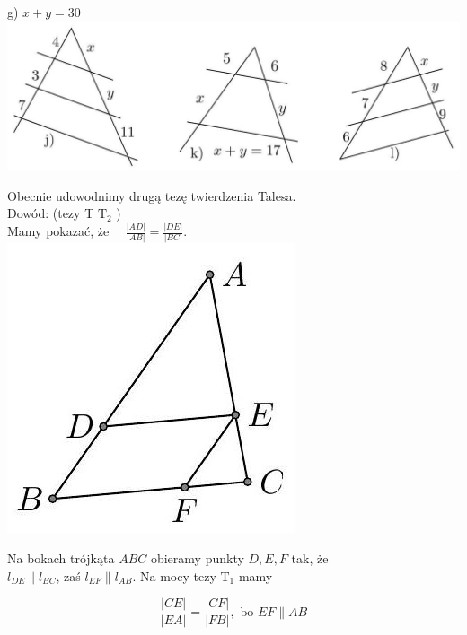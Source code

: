 \documentclass[10pt]{article}
\begin{document}
\begin{enumerate}
g) \(x+y=30\)\\
\includegraphics[max width=\textwidth, center]{2024_11_21_e9b4faa005d5be2cc318g-007(1)}
\end{enumerate}

Obecnie udowodnimy drugą tezę twierdzenia Talesa.\\
Dowód: (tezy T \(\mathrm{T}_{2}\) )\\
Mamy pokazać, że \(\quad \frac{|A D|}{|A B|}=\frac{|D E|}{|B C|}\).\\
\includegraphics[max width=\textwidth, center]{2024_11_21_e9b4faa005d5be2cc318g-008(3)}

Na bokach trójkąta \(A B C\) obieramy punkty \(D, E, F\) tak, że\\
\(l_{D E} \| l_{B C}\), zaś \(l_{E F} \| l_{A B}\). Na mocy tezy \(\mathrm{T}_{1}\) mamy

\[
\frac{|C E|}{|E A|}=\frac{|C F|}{|F B|}, \text { bo } \overline{E F} \| \overline{A B}
\]
\end{document}
